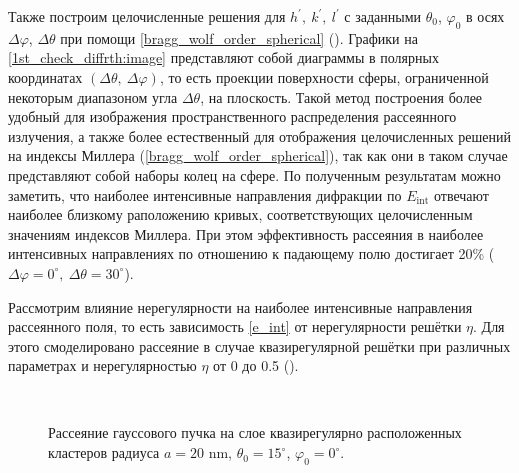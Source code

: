 Также построим целочисленные решения для $h^\prime,\:k^\prime,\:l^\prime$ с заданными $\theta_0$, $\varphi_0$ в осях $\Delta \varphi$, $\Delta \theta$ при помощи \autoref{bragg_wolf_order_spherical} (). Графики на \autoref{1st_check_diffrth:image} представляют собой диаграммы в полярных координатах $(\Delta \theta, \: \Delta \varphi)$, то есть проекции поверхности сферы, ограниченной некоторым диапазоном угла $\Delta \theta$, на плоскость. Такой метод построения более удобный для изображения пространственного распределения рассеянного излучения, а также более естественный для отображения целочисленных решений на индексы Миллера (\autoref{bragg_wolf_order_spherical}), так как они в таком случае представляют собой наборы колец на сфере. По полученным результатам можно заметить, что наиболее интенсивные направления дифракции по $E_{\textrm{int}}$ отвечают наиболее близкому раположению кривых, соответствующих целочисленным значениям индексов Миллера. При этом эффективность рассеяния в наиболее интенсивных направлениях по отношению к падающему полю достигает 20\% ($\Delta \varphi = 0^\circ,\: \Delta \theta = 30^\circ$).

Рассмотрим влияние нерегулярности на наиболее интенсивные направления рассеянного поля, то есть зависимость \autoref{e_int} от нерегулярности решётки $\eta$. Для этого смоделировано рассеяние в случае квазирегулярной решётки при различных параметрах и нерегулярностью $\eta$ от 0 до 0.5 ().


    \begin{figure}[H]

        \hfil
        \\
        \caption{Рассеяние гауссового пучка на слое квазирегулярно расположенных кластеров радиуса $a = 20$ nm, $\theta_0 = 15^{\circ}$, $\varphi_0 = 0^{\circ}$.}\label{nonreg_ka0.7:image}
    \end{figure}

